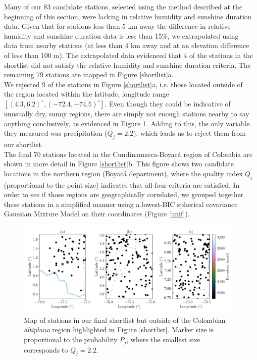 \documentclass[a4paper,fleqn,usenatbib]{mnras}
\begin{document}
Many of our 83 candidate stations, selected using the method described at the beginning of this section, were lacking in relative humidity and sunshine duration data. Given that for stations less than 5 km away the difference in relative humidity and sunshine duration data is less than 15\%, we extrapolated using data from nearby stations (at less than 4 km away and at an elevation difference of less than 100 m). The extrapolated data evidenced that 4 of the stations in the shortlist did not satisfy the relative humidity and sunshine duration criteria.  The remaining 79 stations are mapped in Figure \ref{shortlist}a.\\

We rejected 9 of the stations in Figure \ref{shortlist}a, i.e. those located outside of the region located within the latitude, longitude range $[(4.3,6.2)^\circ,(-72.4,-74.5)^\circ]$. Even though they could be indicative of unusually dry, sunny regions, there are simply not enough stations nearby to say anything conclusively, as evidenced in Figure \ref{outliers}. Adding to this, the only variable they measured was precipitation ($Q_j=2.2$), which leads us to reject them from our shortlist. \\

The final 70 stations located in the Cundinamarca-Boyac\'a region of Colombia are shown in more detail in Figure \ref{shortlist}b. This figure shows two candidate locations in the northern region (Boyac\'a department), where the quality index $Q_j$ (proportional to the point size) indicates that all four criteria are satisfied. In order to see if those regions are geographically correlated, we grouped together these stations in a simplified manner using a lowest-BIC spherical covariance Gaussian Mixture Model on their coordinates (Figure \ref{unif}).

\begin{figure}
\begin{center}
\includegraphics[scale=0.55,trim={0 17 0 18},clip]{outliers.pdf}
\caption{Map of stations in our final shortlist but outside of the Colombian \emph{altiplano} region highlighted in Figure \ref{shortlist}. Marker size is proportional to the probability $P_j$, where the smallest size corresponds to $Q_j=2.2$.}\label{outliers}
\end{center}
\end{figure}
\end{document}
